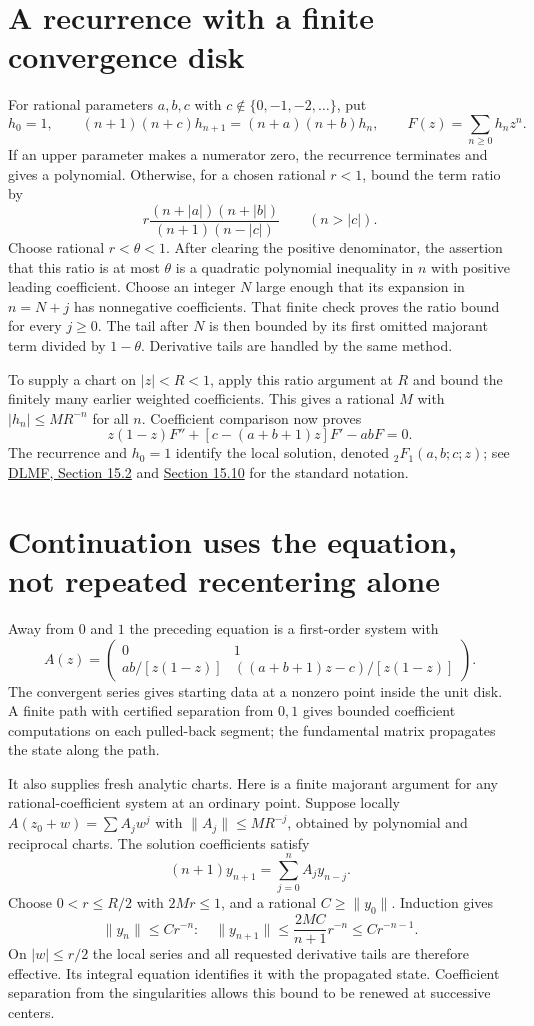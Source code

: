 \section{A recurrence with a finite convergence disk}
For rational parameters $a,b,c$ with $c\notin\{0,-1,-2,\ldots\}$, put
\[
 h_0=1,\qquad
 (n+1)(n+c)h_{n+1}=(n+a)(n+b)h_n,
 \qquad F(z)=\sum_{n\ge0}h_nz^n.
\]
If an upper parameter makes a numerator zero, the recurrence terminates
and gives a polynomial.  Otherwise, for a chosen rational $r<1$, bound
the term ratio by
\[
 r\frac{(n+|a|)(n+|b|)}{(n+1)(n-|c|)}\qquad(n>|c|).
\]
Choose rational $r<\theta<1$.  After clearing the positive denominator,
the assertion that this ratio is at most $\theta$ is a quadratic
polynomial inequality in $n$ with positive leading coefficient.  Choose
an integer $N$ large enough that its expansion in $n=N+j$ has nonnegative
coefficients.  That finite check proves the ratio bound for every $j\ge0$.
The tail after $N$ is then bounded by its first omitted majorant term
divided by $1-\theta$.  Derivative tails are handled by the same method.

To supply a chart on $|z|<R<1$, apply this ratio argument at $R$ and
bound the finitely many earlier weighted coefficients.  This gives a
rational $M$ with $|h_n|\le M R^{-n}$ for all $n$.
Coefficient comparison now proves
\[
 \boxed{z(1-z)F''+[c-(a+b+1)z]F'-abF=0.}
\]
The recurrence and $h_0=1$ identify the local solution, denoted
${}_2F_1(a,b;c;z)$; see
\href{https://dlmf.nist.gov/15.2}{DLMF, Section 15.2} and
\href{https://dlmf.nist.gov/15.10}{Section 15.10} for the standard notation.

\section{Continuation uses the equation, not repeated recentering alone}
Away from $0$ and $1$ the preceding equation is a first-order system with
\[
 A(z)=\begin{pmatrix}
 0&1\\
 ab/[z(1-z)]&((a+b+1)z-c)/[z(1-z)]
 \end{pmatrix}.
\]
The convergent series gives starting data at a nonzero point inside the
unit disk.  A finite path with certified separation from $0,1$ gives
bounded coefficient computations on each pulled-back segment; the
fundamental matrix propagates the state along the path.

It also supplies fresh analytic charts.  Here is a finite majorant
argument for any rational-coefficient system at an ordinary point.
Suppose locally $A(z_0+w)=\sum A_jw^j$ with
$\|A_j\|\le M R^{-j}$, obtained by polynomial and reciprocal charts.
The solution coefficients satisfy
\[
 (n+1)y_{n+1}=\sum_{j=0}^n A_jy_{n-j}.
\]
Choose $0<r\le R/2$ with $2Mr\le1$, and a rational
$C\ge\|y_0\|$.  Induction gives
\[
 \|y_n\|\le Cr^{-n}:
 \quad \|y_{n+1}\|\le\frac{2MC}{n+1}r^{-n}
                                      \le Cr^{-n-1}.
\]
On $|w|\le r/2$ the local series and all requested derivative tails
are therefore effective.  Its integral equation identifies it with the
propagated state.  Coefficient separation from the singularities allows
this bound to be renewed at successive centers.

